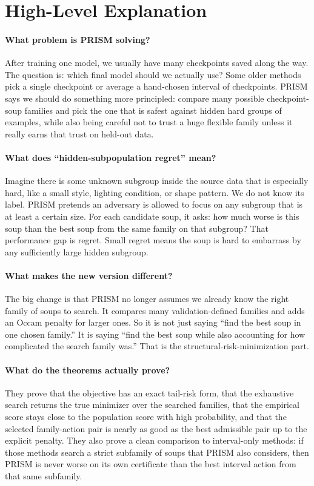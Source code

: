 \documentclass{article}
\newcommand{\prism}{\textup{\textsc{PRISM}}}
\newcommand{\1}{\mathbbm{1}}
\begin{document}
\section{High-Level Explanation}

\paragraph{What problem is \prism{} solving?}
After training one model, we usually have many checkpoints saved along the way. The question is: which final model should we actually use? Some older methods pick a single checkpoint or average a hand-chosen interval of checkpoints. \prism{} says we should do something more principled: compare many possible checkpoint-soup families and pick the one that is safest against hidden hard groups of examples, while also being careful not to trust a huge flexible family unless it really earns that trust on held-out data.

\paragraph{What does “hidden-subpopulation regret” mean?}
Imagine there is some unknown subgroup inside the source data that is especially hard, like a small style, lighting condition, or shape pattern. We do not know its label. \prism{} pretends an adversary is allowed to focus on any subgroup that is at least a certain size. For each candidate soup, it asks: how much worse is this soup than the best soup from the same family on that subgroup? That performance gap is regret. Small regret means the soup is hard to embarrass by any sufficiently large hidden subgroup.

\paragraph{What makes the new version different?}
The big change is that \prism{} no longer assumes we already know the right family of soups to search. It compares many validation-defined families and adds an Occam penalty for larger ones. So it is not just saying “find the best soup in one chosen family.” It is saying “find the best soup while also accounting for how complicated the search family was.” That is the structural-risk-minimization part.

\paragraph{What do the theorems actually prove?}
They prove that the objective has an exact tail-risk form, that the exhaustive search returns the true minimizer over the searched families, that the empirical score stays close to the population score with high probability, and that the selected family-action pair is nearly as good as the best admissible pair up to the explicit penalty. They also prove a clean comparison to interval-only methods: if those methods search a strict subfamily of soups that \prism{} also considers, then \prism{} is never worse on its own certificate than the best interval action from that same subfamily.
\end{document}
